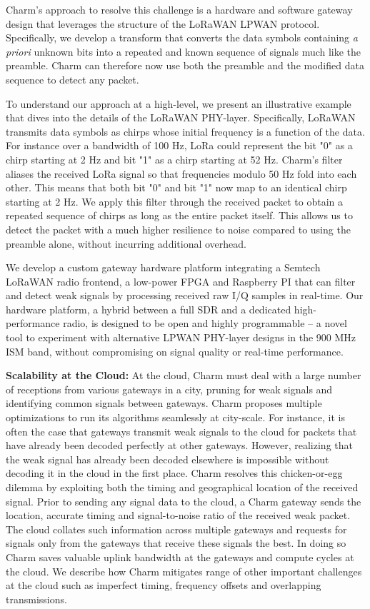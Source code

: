 Charm's approach to resolve this challenge is a hardware and software gateway
design that leverages the structure of the LoRaWAN LPWAN protocol.
Specifically, we develop a transform that converts the data symbols containing
\textit{a priori} unknown bits into a repeated and known sequence of signals
much like the preamble. Charm can therefore now use both the preamble and the
modified data sequence to detect any packet.

To understand our approach at a high-level, we present an illustrative example
that dives into the details of the LoRaWAN PHY-layer. Specifically, LoRaWAN
transmits data symbols as chirps whose initial frequency is a function of the
data. For instance over a bandwidth of 100 Hz, LoRa could represent the bit
"0" as a chirp starting at 2 Hz and bit "1" as a chirp starting at 52 Hz.
Charm's filter aliases the received LoRa signal so that frequencies modulo 50
Hz fold into each other. This means that both bit "0" and bit "1" now map to
an identical chirp starting at 2 Hz. We apply this filter through
the received packet to obtain a repeated sequence of chirps as long as the
entire packet itself. This allows us to detect the packet with a much higher
resilience to noise compared to using the preamble alone, without incurring
additional overhead.

We develop a custom gateway hardware platform integrating a Semtech LoRaWAN
radio frontend, a low-power FPGA and Raspberry PI that can filter and detect
weak signals by processing received raw I/Q samples in real-time. Our hardware
platform, a hybrid between a full SDR and a dedicated high-performance radio,
is designed to be open and highly programmable -- a novel tool to experiment
with alternative LPWAN PHY-layer designs in the 900 MHz ISM band, without
compromising on signal quality or real-time performance.

\noindent \textbf{Scalability at the Cloud:} At the cloud, Charm must deal
with a large number of receptions from various gateways in a city, pruning for
weak signals and identifying common signals between gateways. Charm proposes
multiple optimizations to run its algorithms seamlessly at city-scale. For
instance, it is often the case that gateways transmit weak signals to the
cloud for packets that have already been decoded perfectly at other gateways.
However, realizing that the weak signal has already been decoded elsewhere is
impossible without decoding it in the cloud in the first place. Charm resolves
this chicken-or-egg dilemma by exploiting both the timing and geographical
location of the received signal. Prior to sending any signal data to the
cloud, a Charm gateway sends the location, accurate timing and signal-to-noise
ratio of the received weak packet. The cloud collates such information across
multiple gateways and requests for signals only from the gateways that receive
these signals the best. In doing so Charm saves valuable uplink bandwidth at
the gateways and compute cycles at the cloud. We describe how Charm mitigates
range of other important challenges at the cloud such as imperfect timing,
frequency offsets and overlapping transmissions.

